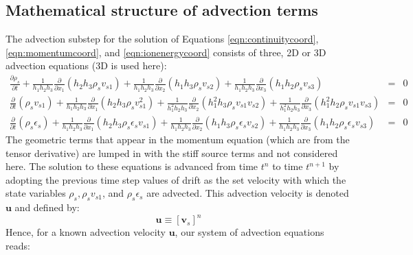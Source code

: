 \documentclass[11pt,letterpaper]{article}
\begin{document}
\subsection{Mathematical structure of advection terms}

The advection substep for the solution of Equations \ref{eqn:continuitycoord}, \ref{eqn:momentumcoord}, and \ref{eqn:ionenergycoord} consists of three, 2D or 3D advection equations (3D is used here):
\begin{eqnarray}
\frac{\partial \rho_s}{\partial t} + \frac{1}{h_1 h_2 h_3} \frac{\partial}{\partial x_1} \left( h_2 h_3 \rho_s v_{s1} \right) + \frac{1}{h_1 h_2 h_3} \frac{\partial}{\partial x_2} \left( h_1 h_3 \rho_s v_{s2} \right) + \frac{1}{h_1 h_2 h_3} \frac{\partial}{\partial x_3} \left( h_1 h_2 \rho_s v_{s3} \right) &=& 0 \nonumber \\
\frac{\partial}{\partial t} \left( \rho_s v_{s1} \right) + \frac{1}{h_1 h_2 h_3} \frac{\partial}{\partial x_1} \left( h_2 h_3 \rho_s v_{s1}^2 \right) + \frac{1}{h_1^2 h_2 h_3} \frac{\partial}{\partial x_2} \left( h_1^2 h_3 \rho_s v_{s1} v_{s2} \right) + \frac{1}{h_1^2 h_2 h_3} \frac{\partial}{\partial x_3} \left( h_1^2 h_2 \rho_s v_{s1} v_{s3} \right) &=& 0 \nonumber \\
\frac{\partial}{\partial t} \left( \rho_s \epsilon_s \right) + \frac{1}{h_1 h_2 h_3} \frac{\partial}{\partial x_1} \left( h_2 h_3 \rho_s \epsilon_s v_{s1} \right) + \frac{1}{h_1 h_2 h_3} \frac{\partial}{\partial x_2} \left( h_1 h_3 \rho_s \epsilon_s v_{s2} \right) + \frac{1}{h_1 h_2 h_3} \frac{\partial}{\partial x_3} \left( h_1 h_2 \rho_s \epsilon_s v_{s3} \right) &=& 0 \nonumber 
\end{eqnarray}
The geometric terms that appear in the momentum equation (which are from the tensor derivative) are lumped in with the stiff source terms and not considered here.  The solution to these equations is advanced from time $t^n$ to time $t^{n+1}$ by adopting the previous time step values of drift as the set velocity with which the state variables $\rho_s,\rho_s v_{s1}$, and $\rho_s \epsilon_s$ are advected.  This advection velocity is denoted $\mathbf{u}$ and defined by:  
\begin{equation}
\mathbf{u} \equiv [\mathbf{v}_s]^n
\end{equation}
Hence, for a known advection velocity $\mathbf{u}$, our system of advection equations reads:
\end{document}
